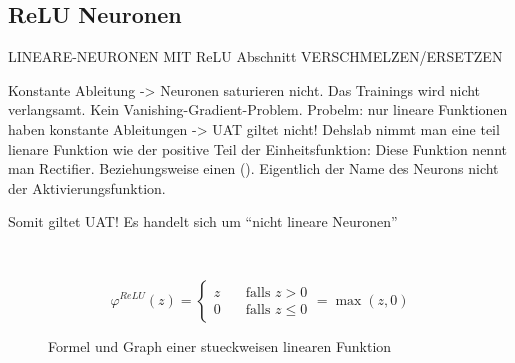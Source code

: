 \para{}
\cite{wiki:kuenstliches_neuron}

\subsection{ReLU Neuronen}
LINEARE-NEURONEN MIT ReLU Abschnitt VERSCHMELZEN/ERSETZEN

Konstante Ableitung -> Neuronen saturieren nicht. Das Trainings wird nicht
verlangsamt. Kein Vanishing-Gradient-Problem.
Probelm: nur lineare Funktionen haben konstante Ableitungen -> UAT giltet nicht!
Dehslab nimmt man eine teil lienare Funktion wie der positive Teil der
Einheitsfunktion:
Diese Funktion nennt man Rectifier. Beziehungsweise einen  (). Eigentlich der Name des Neurons nicht der Aktivierungsfunktion.

Somit giltet UAT! Es handelt sich um ``nicht lineare Neuronen''

\\
\begin{figure}[h!]
  \begin{minipage}[h!]{0.5\textwidth}
    \begin{equation}
      \varphi^{ReLU}(z) =
      \begin{cases}
        z & \quad \text{falls } z > 0\\
        0 & \quad \text{falls } z \leq 0
      \end{cases}
      = \max(z,0)
    \end{equation}
  \end{minipage}
  \begin{minipage}[h!]{0.5\textwidth}
    \centering
  \end{minipage}
  \caption{Formel und Graph einer stueckweisen linearen Funktion}
  \label{fig:stueckweiselinear}
\end{figure}

